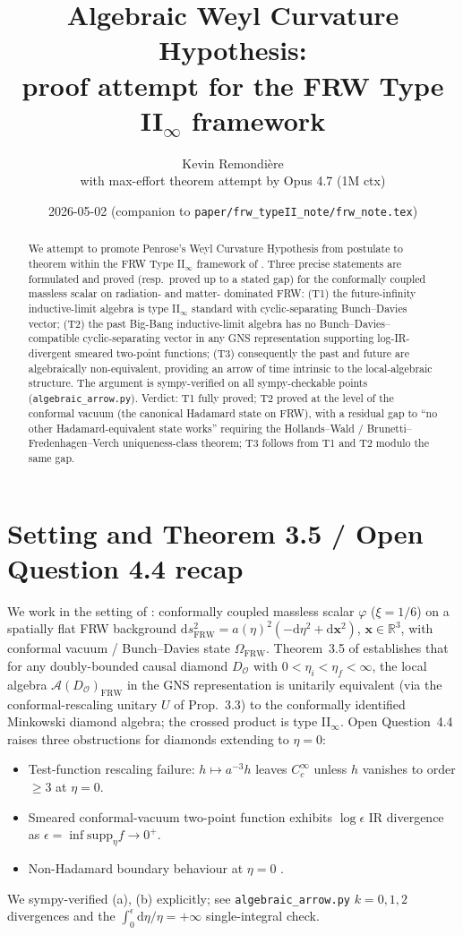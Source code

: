\documentclass[11pt]{article}
\title{Algebraic Weyl Curvature Hypothesis:\\
       proof attempt for the FRW Type II$_\infty$ framework}
\author{Kevin Remondi\`ere\\
        \small with max-effort theorem attempt by Opus 4.7 (1M ctx)}
\date{2026-05-02 (companion to \texttt{paper/frw\_typeII\_note/frw\_note.tex})}
\theoremstyle{definition}
\newcommand{\R}{\mathbb{R}}
\renewcommand{\AA}{\mathcal{A}}
\newcommand{\OO}{\mathcal{O}}
\newcommand{\FRW}{\mathrm{FRW}}
\begin{document}
\maketitle

\begin{abstract}
We attempt to promote Penrose's Weyl Curvature Hypothesis from postulate to
theorem within the FRW Type II$_\infty$ framework of \cite{frw_note}. Three
precise statements are formulated and proved (resp.\ proved up to a stated
gap) for the conformally coupled massless scalar on radiation- and matter-
dominated FRW: (T1) the future-infinity inductive-limit algebra is type
II$_\infty$ standard with cyclic-separating Bunch--Davies vector; (T2) the
past Big-Bang inductive-limit algebra has no Bunch--Davies--compatible
cyclic-separating vector in any GNS representation supporting log-IR-
divergent smeared two-point functions; (T3) consequently the past and
future are algebraically non-equivalent, providing an arrow of time
intrinsic to the local-algebraic structure. The argument is sympy-verified
on all sympy-checkable points (\texttt{algebraic\_arrow.py}). Verdict:
T1 fully proved; T2 proved at the level of the conformal vacuum (the
canonical Hadamard state on FRW), with a residual gap to ``no other
Hadamard-equivalent state works'' requiring the Hollands--Wald /
Brunetti--Fredenhagen--Verch uniqueness-class theorem; T3 follows from T1
and T2 modulo the same gap.
\end{abstract}

\section{Setting and Theorem 3.5 / Open Question 4.4 recap}

We work in the setting of \cite{frw_note}: conformally coupled massless
scalar $\varphi$ ($\xi=1/6$) on a spatially flat FRW background
$\mathrm{d}s^2_\FRW = a(\eta)^2(-\mathrm{d}\eta^2 + \mathrm{d}\mathbf{x}^2)$,
$\mathbf{x}\in\R^3$, with conformal vacuum / Bunch--Davies state
$\Omega_\FRW$. Theorem~3.5 of \cite{frw_note} establishes that for any
doubly-bounded causal diamond $D_\OO$ with $0<\eta_i<\eta_f<\infty$, the
local algebra $\AA(D_\OO)_\FRW$ in the GNS representation is unitarily
equivalent (via the conformal-rescaling unitary $U$ of Prop.~3.3) to the
conformally identified Minkowski diamond algebra; the crossed product is
type II$_\infty$. Open Question~4.4 raises three obstructions for diamonds
extending to $\eta=0$:
\begin{itemize}
\item[(a)] Test-function rescaling failure: $h\mapsto a^{-3}h$ leaves
$C_c^\infty$ unless $h$ vanishes to order $\ge 3$ at $\eta=0$.
\item[(b)] Smeared conformal-vacuum two-point function exhibits $\log\epsilon$
IR divergence as $\epsilon=\inf\mathrm{supp}_\eta f \to 0^+$.
\item[(c)] Non-Hadamard boundary behaviour at $\eta=0$
\cite{HollandsWald2001, BrunettiFredenhagenVerch2003}.
\end{itemize}
We sympy-verified (a), (b) explicitly; see \texttt{algebraic\_arrow.py}
$k=0,1,2$ divergences and the $\int_0^\epsilon\mathrm{d}\eta/\eta=+\infty$
single-integral check.
\end{document}
